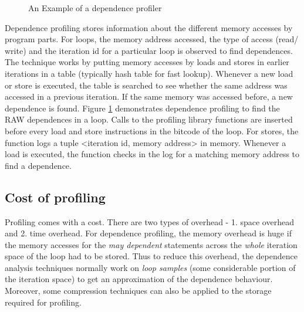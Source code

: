 \documentclass[10pt]{report}          %
\begin{document}
\begin{figure}[h]
\begin{center}
\caption{An Example of a dependence profiler}
\end{center}
\label{fig:dep_profiler}
\end{figure}

Dependence profiling stores information about the different memory accesses by program parts.  For loops, the memory address accessed, the type of access (read/ write) and the iteration id for a particular loop is observed to find dependences.  The technique works by putting memory accesses by loads and stores in earlier iterations in a table (typically hash table for fast lookup).  Whenever a new load or store is executed, the table is searched to see whether the same address was accessed in a previous iteration.  If the same memory was accessed before, a new dependence is found. Figure \ref{fig:dep_profiler} demonstrates dependence profiling to find the RAW dependences in a loop.  Calls to the profiling library functions are inserted before every load and store instructions in the bitcode of the loop. For stores, the function logs a tuple <iteration id, memory address> in memory. Whenever a load is executed, the function checks in the log for a matching memory address to find a dependence.

\subsection{Cost of profiling}

Profiling comes with a cost.  There are two types of overhead - 1. space overhead and 2. time overhead.  For dependence profiling, the memory overhead is huge if the memory accesses for the \textit{may dependent} statements across the \textit{whole} iteration space of the loop had to be stored.  Thus to reduce this overhead, the dependence analysis techniques normally work on \textit{loop samples} (some considerable portion of the iteration space) to get an approximation of the dependence behaviour.  Moreover, some compression techniques can also be applied to the storage required for profiling. \\
\end{document}

